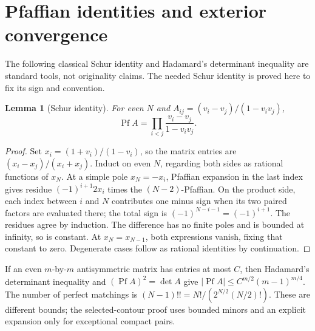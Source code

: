 \documentclass[11pt]{article}
\numberwithin{equation}{section}
\newtheorem{lemma}[theorem]{Lemma}
\theoremstyle{definition}
\newcommand{\Pf}{\operatorname{Pf}}
\begin{document}
\section{Pfaffian identities and exterior convergence}\label{app:pfaffian}
The following classical Schur identity and Hadamard's determinant
inequality are standard tools, not originality claims. The needed
Schur identity is proved here to fix its sign and convention.
\begin{lemma}[Schur identity]\label{lem:schur}
For even \(N\) and \(A_{ij}=(v_i-v_j)/(1-v_iv_j)\),
\[
 \Pf A=\prod_{i<j}\frac{v_i-v_j}{1-v_iv_j}.
\]
\end{lemma}
\begin{proof}
Set \(x_i=(1+v_i)/(1-v_i)\), so the matrix entries are
\((x_i-x_j)/(x_i+x_j)\).
Induct on even \(N\), regarding both sides as rational functions of
\(x_N\). At a simple pole \(x_N=-x_i\), Pfaffian expansion in the
last index gives residue
\((-1)^{i+1}2x_i\) times the \((N-2)\)-Pfaffian.
On the product side, each index between \(i\) and \(N\) contributes
one minus sign when its two paired factors are evaluated there;
the total sign is \((-1)^{N-i-1}=(-1)^{i+1}\).
The residues agree by induction. The difference has no finite poles
and is bounded at infinity, so is constant. At \(x_N=x_{N-1}\),
both expressions vanish, fixing that constant to zero.
Degenerate cases follow as rational identities by continuation.
\end{proof}

If an even \(m\)-by-\(m\) antisymmetric matrix has entries at most \(C\),
then Hadamard's determinant inequality and
\((\Pf A)^2=\det A\) give
\(|\Pf A|\le C^{m/2}(m-1)^{m/4}\).
The number of perfect matchings is
\((N-1)!!=N!/(2^{N/2}(N/2)!)\).
These are different bounds; the selected-contour proof uses bounded
minors and an explicit expansion only for exceptional compact pairs.
\end{document}
